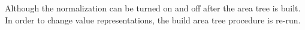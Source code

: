 Although the normalization can be turned on and off after the area tree is built. In order to change value representations, the build area tree procedure is re-run.



%
%
%

